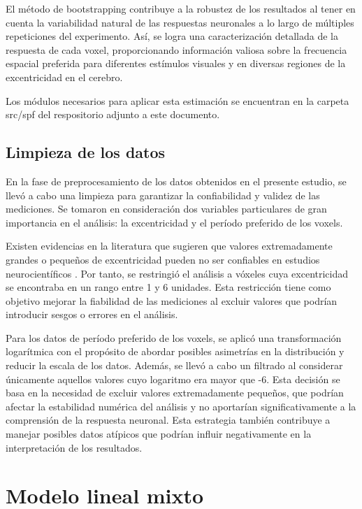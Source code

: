 El método de bootstrapping contribuye a la robustez de los resultados al tener en cuenta la variabilidad natural de las respuestas neuronales a lo largo de múltiples repeticiones del experimento. Así, se logra una caracterización detallada de la respuesta de cada voxel, proporcionando información valiosa sobre la frecuencia espacial preferida para diferentes estímulos visuales y en diversas regiones de la excentricidad en el cerebro.

Los m\'odulos necesarios para aplicar esta estimaci\'on se encuentran en la carpeta src/spf del respositorio adjunto a este documento.

\subsection{Limpieza de los datos}

En la fase de preprocesamiento de los datos obtenidos en el presente estudio, se llevó a cabo una limpieza para garantizar la confiabilidad y validez de las mediciones. Se tomaron en consideración dos variables particulares de gran importancia en el análisis: la excentricidad y el período preferido de los voxels.

Existen evidencias en la literatura que sugieren que valores extremadamente grandes o pequeños de excentricidad pueden no ser confiables en estudios neurocientíficos . Por tanto, se restringi\'o el análisis a v\'oxeles cuya excentricidad se encontraba en un rango entre 1 y 6 unidades. Esta restricción tiene como objetivo mejorar la fiabilidad de las mediciones al excluir valores que podrían introducir sesgos o errores en el análisis.

Para los datos de período preferido de los voxels, se aplicó una transformación logarítmica con el propósito de abordar posibles asimetrías en la distribución y reducir la escala de los datos. Además, se llevó a cabo un filtrado al considerar únicamente aquellos valores cuyo logaritmo era mayor que -6. Esta decisión se basa en la necesidad de excluir valores extremadamente pequeños, que podrían afectar la estabilidad numérica del análisis y no aportarían significativamente a la comprensión de la respuesta neuronal. Esta estrategia también contribuye a manejar posibles datos atípicos que podrían influir negativamente en la interpretación de los resultados.

\section{Modelo lineal mixto}

